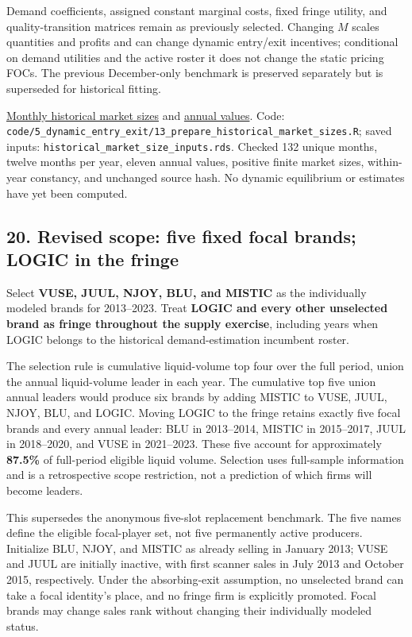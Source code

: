 \documentclass[10pt,]{article}
\begin{document}
Demand coefficients, assigned constant marginal costs, fixed fringe
utility, and quality-transition matrices remain as previously selected.
Changing \(M\) scales quantities and profits and can change dynamic
entry/exit incentives; conditional on demand utilities and the active
roster it does not change the static pricing FOCs. The previous
December-only benchmark is preserved separately but is superseded for
historical fitting.

\href{../../output/dynamic_entry_exit/historical_market_sizes_2026-11-04/monthly_market_size_path.csv}{Monthly
historical market sizes} and
\href{../../output/dynamic_entry_exit/historical_market_sizes_2026-11-04/annual_market_sizes.csv}{annual
values}. Code:
\texttt{code/5\_dynamic\_entry\_exit/13\_prepare\_historical\_market\_sizes.R};
saved inputs: \texttt{historical\_market\_size\_inputs.rds}. Checked 132
unique months, twelve months per year, eleven annual values, positive
finite market sizes, within-year constancy, and unchanged source hash.
No dynamic equilibrium or estimates have yet been computed.

\subsection{20. Revised scope: five fixed focal brands; LOGIC in the
fringe}\label{revised-scope-five-fixed-focal-brands-logic-in-the-fringe}

Select \textbf{VUSE, JUUL, NJOY, BLU, and MISTIC} as the individually
modeled brands for 2013--2023. Treat \textbf{LOGIC and every other
unselected brand as fringe throughout the supply exercise}, including
years when LOGIC belongs to the historical demand-estimation incumbent
roster.

The selection rule is cumulative liquid-volume top four over the full
period, union the annual liquid-volume leader in each year. The
cumulative top five union annual leaders would produce six brands by
adding MISTIC to VUSE, JUUL, NJOY, BLU, and LOGIC. Moving LOGIC to the
fringe retains exactly five focal brands and every annual leader: BLU in
2013--2014, MISTIC in 2015--2017, JUUL in 2018--2020, and VUSE in
2021--2023. These five account for approximately \textbf{87.5\%} of
full-period eligible liquid volume. Selection uses full-sample
information and is a retrospective scope restriction, not a prediction
of which firms will become leaders.

This supersedes the anonymous five-slot replacement benchmark. The five
names define the eligible focal-player set, not five permanently active
producers. Initialize BLU, NJOY, and MISTIC as already selling in
January 2013; VUSE and JUUL are initially inactive, with first scanner
sales in July 2013 and October 2015, respectively. Under the
absorbing-exit assumption, no unselected brand can take a focal
identity's place, and no fringe firm is explicitly promoted. Focal
brands may change sales rank without changing their individually modeled
status.
\end{document}
